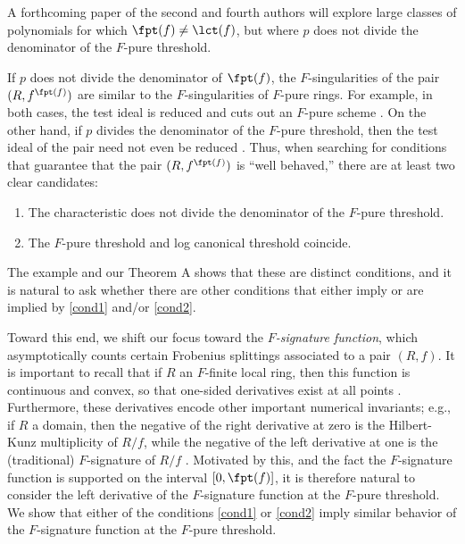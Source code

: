 \documentclass[11pt]{amsart}
\begin{document}
\begin{remark}
A forthcoming paper of the second and fourth authors will explore large classes of polynomials for which $\fpt(f) \neq \lct(f)$, but where $p$ does not divide the denominator of the $F$-pure threshold.
\end{remark}

If $p$ does not divide the denominator of $\fpt(f)$, the $F$-singularities of the pair $(R, f^{\fpt(f)})$ are similar to the $F$-singularities of $F$-pure rings.
For example, in both cases, the test ideal is reduced and cuts out an $F$-pure scheme \cite{VassilevTestIdeals,SchwedeSharpTestElements}.
On the other hand, if $p$ divides the denominator of the $F$-pure threshold, then the test ideal of the pair need not even be reduced \cite{MustataYoshidaTestIdealVsMultiplierIdeals}.  Thus, when searching for conditions that guarantee that the pair $(R, f^{\fpt(f)})$ is ``well behaved,'' there are at least two clear candidates:
\begin{enumerate}
\item  The characteristic does not divide the denominator of the $F$-pure threshold.
\label{cond1}
\item The $F$-pure threshold and log canonical threshold coincide.
\label{cond2}
\end{enumerate}
The example \cite[Example 4.5]{MustataTakagiWatanabeFThresholdsAndBernsteinSato} and our Theorem A shows that these are distinct conditions, and it is natural to ask whether there are other conditions that either imply or are implied by \eqref{cond1} and/or \eqref{cond2}.

Toward this end, we shift our focus toward the \emph{$F$-signature function}, which asymptotically counts certain Frobenius splittings associated to a pair $(R,f)$.   It is important to recall that if $R$ an $F$-finite local ring, then this function is continuous and convex, so that one-sided derivatives exist at all points \cite[Theorems 3.2, 3.5]{BlickleSchwedeTuckerTestIdeals2}.  Furthermore, these derivatives encode other important numerical invariants; e.g., if $R$ a domain, then the negative of the right derivative at zero is the Hilbert-Kunz multiplicity of $R/f$, while the negative of the left derivative at one is the (traditional) $F$-signature of $R/f$ \cite[Theorem 4.4]{BlickleSchwedeTuckerTestIdeals2}.  Motivated by this, and the fact the $F$-signature function is supported on the interval $[0, \fpt(f)]$, it is therefore natural to consider the left derivative of the $F$-signature function at the $F$-pure threshold.  We show that either of the conditions \eqref{cond1} or \eqref{cond2} imply similar behavior of the $F$-signature function at the $F$-pure threshold.
\end{document}
